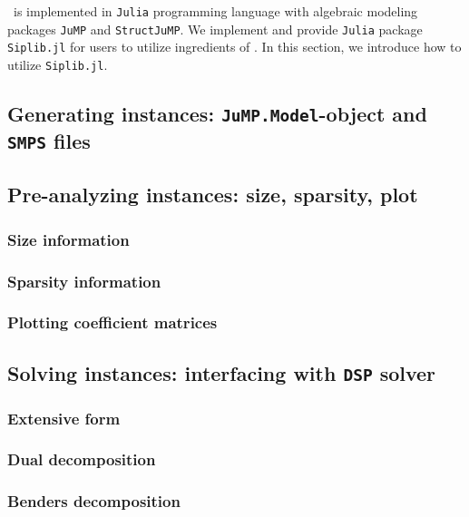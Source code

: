 \siplibtwo\ is implemented in \texttt{Julia} programming language with algebraic modeling packages \texttt{JuMP} and \texttt{StructJuMP}. We implement and provide \texttt{Julia} package \texttt{Siplib.jl} for users to utilize ingredients of \siplibtwo. In this section, we introduce how to utilize \texttt{Siplib.jl}.

\subsection{Generating instances: \texttt{JuMP.Model}-object and \texttt{SMPS} files}


\subsection{Pre-analyzing instances: size, sparsity, plot}

\subsubsection{Size information}

\subsubsection{Sparsity information}

\subsubsection{Plotting coefficient matrices}

\subsection{Solving instances: interfacing with \texttt{DSP} solver}
\subsubsection{Extensive form}

\subsubsection{Dual decomposition}

\subsubsection{Benders decomposition}